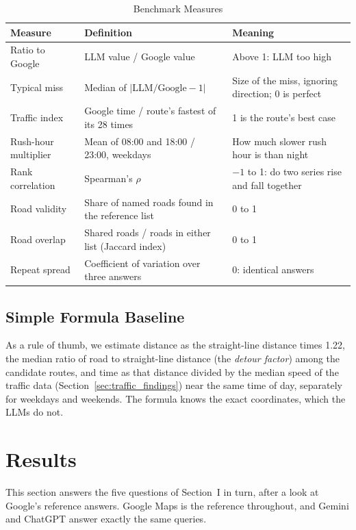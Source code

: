 \documentclass[conference]{IEEEtran}
\begin{document}
\begin{table}[!htb]
\caption{Benchmark Measures}
\label{tab:measures}
\centering
\footnotesize
\begin{tabular}{L{1.8cm}L{2.8cm}L{2.9cm}}
\hline
Measure & Definition & Meaning \\
\hline
Ratio to Google & LLM value / Google value & Above 1: LLM too high \\
Typical miss & Median of $|\text{LLM}/\text{Google}-1|$ & Size of the miss, ignoring direction; 0 is perfect \\
Traffic index & Google time / route's fastest of its 28 times & 1 is the route's best case \\
Rush-hour multiplier & Mean of 08:00 and 18:00 / 23:00, weekdays & How much slower rush hour is than night \\
Rank correlation & Spearman's $\rho$ & $-1$ to 1: do two series rise and fall together \\
Road validity & Share of named roads found in the reference list & 0 to 1 \\
Road overlap & Shared roads / roads in either list (Jaccard index) & 0 to 1 \\
Repeat spread & Coefficient of variation over three answers & 0: identical answers \\
\hline
\end{tabular}
\end{table}

\subsection{Simple Formula Baseline}\label{sec:baseline}
As a rule of thumb, we estimate distance as the straight-line distance times 1.22, the median ratio of road to straight-line distance (the \emph{detour factor}) among the candidate routes, and time as that distance divided by the median speed of the traffic data (Section~\ref{sec:traffic_findings}) near the same time of day, separately for weekdays and weekends. The formula knows the exact coordinates, which the LLMs do not.

\section{Results}\label{sec:results}
This section answers the five questions of Section~I in turn, after a look at Google's reference answers. Google Maps is the reference throughout, and Gemini and ChatGPT answer exactly the same queries.
\end{document}
